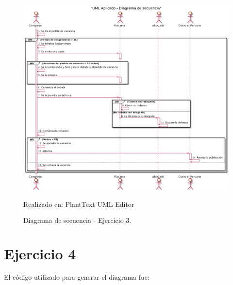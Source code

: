 \documentclass[a4paper,12pt]{article}
\begin{document}
\clearpage
\newpage
    
    

\begin{figure}[p]
        \centering        
        \includegraphics[width=1\textwidth]{images/umlA02.PNG}
        \caption{Diagrama de secuencia - Ejercicio 3.}  
        {{\footnotesize Realizado en: PlantText UML Editor }}
\end{figure}

    
\clearpage
\newpage

\section*{Ejercicio 4}

El código utilizado para generar el diagrama fue:
\end{document}
